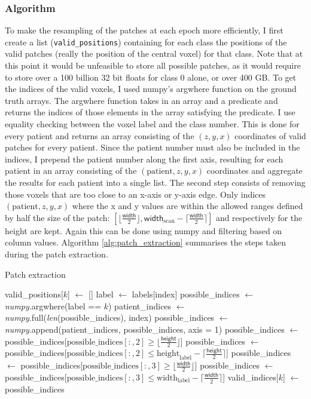 \documentclass[12pt,a4paper,twoside,openright]{report}
\begin{document}
\subsubsection{Algorithm}
To make the resampling of the patches at each epoch more efficiently, I first create a list (\texttt{valid\_positions}) containing for each class the positions of the valid patches (really the position of the central voxel) for that class. Note that at this point it would be unfeasible to store all possible patches, as it would require to store over a 100 billion 32 bit floats for class 0 alone, or over 400 GB. To get the indices of the valid voxels, I used numpy's argwhere function on the ground truth arrays. The argwhere function takes in an array and a predicate and returns the indices of those elements in the array satisfying the predicate. I use equality checking between the voxel label and the class number. This is done for every patient and returns an array consisting of the $(z, y, x)$ coordinates of valid patches for every patient. Since the patient number must also be included in the indices, I prepend the patient number along the first axis, resulting for each patient in an array consisting of the $(\text{patient}, z, y, x)$ coordinates and aggregate the results for each patient into a single list. The second step consists of removing those voxels that are too close to an x-axis or y-axis edge. Only indices $(\text{patient}, z, y, x)$ where the x and y values are  within the allowed ranges defined by half the size of the patch: $[\lfloor \frac{\textsf{width}}{2} \rfloor, \textsf{width}_{\text{scan}} - \lceil \frac{\textsf{width}}{2} \rceil]$ and respectively for the height are kept. Again this can be done using numpy and filtering based on column values. Algorithm \ref{alg:patch_extraction} summarises the steps taken during the patch extraction. 

\begin{algorithm}
\caption{Patch extraction}\label{alg:patch_extraction}
\begin{algorithmic}[1]
	\State valid\_positions[$k$] $\gets$ []
		\State label $\gets$ labels[index] 
		\State possible\_indices $\gets$ \textit{numpy}.argwhere(label == $k$)
		\State patient\_indices $\gets$ \textit{numpy}.full(\textit{len}(possible\_indices), index)
		\State possible\_indices $\gets$ \textit{numpy}.append(patient\_indices, possible\_indices, axis = 1)
		\State
		\State possible\_indices $\gets$ possible\_indices[$\text{possible\_indices}[:,2] \ge \lfloor \frac{\textsf{height}}{2} \rfloor$]
		\State possible\_indices $\gets$ possible\_indices[$\text{possible\_indices}[:,2] \leq \text{height}_{\text{label}} - \lceil \frac{\textsf{height}}{2} \rceil$]
		\State possible\_indices $\gets$ possible\_indices[$\text{possible\_indices}[:,3] \ge \lfloor \frac{\textsf{width}}{2} \rfloor$]
		\State possible\_indices $\gets$ possible\_indices[$\text{possible\_indices}[:,3]  \leq  \text{width}_{\text{label}} - \lceil \frac{\textsf{width}}{2} \rceil$]
		\State
		\State valid\_indices[$k$] $\gets$ possible\_indices
	\EndFor
\EndFor
\end{algorithmic}
\end{algorithm}
\end{document}
